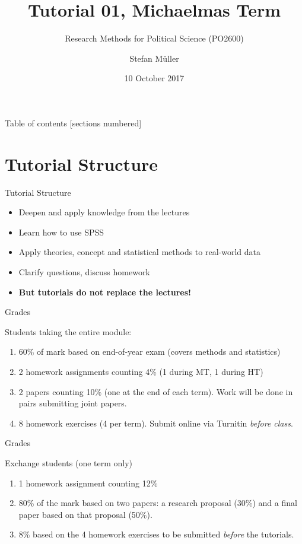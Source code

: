 \documentclass[10pt]{beamer}
\title{Tutorial 01, Michaelmas Term}
\subtitle{Research Methods for Political Science (PO2600)}
\date{10 October 2017}
\author{Stefan Müller}
\institute{Trinity College Dublin}
\begin{document}
\maketitle

\begin{frame}{Table of contents}
  [sections numbered]
  \tableofcontents%
\end{frame}

\section{Tutorial Structure}
\begin{frame}{Tutorial Structure}

\begin{itemize}
\item Deepen and apply knowledge from the lectures
\item Learn how to use SPSS
\item Apply theories, concept and statistical methods to real-world data
\item Clarify questions, discuss homework
\item \textbf{But tutorials do not replace the lectures!}
\end{itemize}

\end{frame}

\begin{frame}{Grades}

Students taking the entire module:

\begin{enumerate}
\item 60\% of mark based on end-of-year exam (covers methods and statistics)
\item 2 homework assignments counting 4\% (1 during MT, 1 during HT)
\item 2 papers counting 10\% (one at the end of each term). Work will be done in pairs submitting joint papers.
\item 8 homework exercises (4 per term). Submit online via Turnitin \textit{before class}.
\end{enumerate}
\end{frame}

\begin{frame}{Grades}

Exchange students (one term only)
\begin{enumerate}
\item 1 homework assignment counting 12\%
\item 80\% of the mark based on two papers: a research proposal (30\%) and a final paper based on that proposal (50\%).
\item 8\% based on the 4 homework exercises to be submitted \textit{before} the tutorials.
\end{enumerate}
\end{frame}
\end{document}
